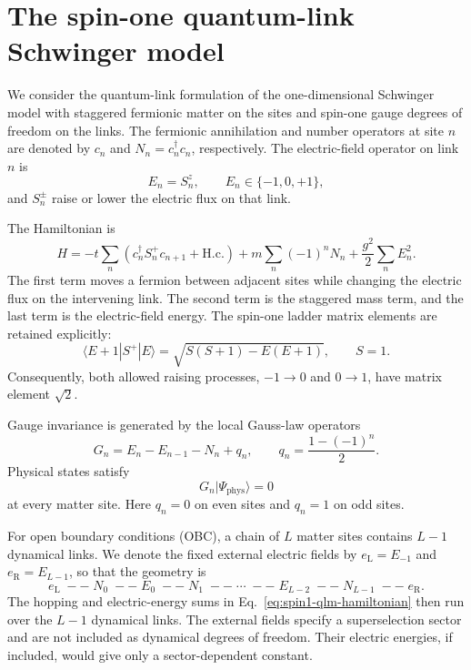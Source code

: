 \section{The spin-one quantum-link Schwinger model}
\label{sec:spin1-qlm-model}

We consider the quantum-link formulation of the one-dimensional Schwinger
model with staggered fermionic matter on the sites and spin-one gauge degrees
of freedom on the links.  The fermionic annihilation and number operators at
site $n$ are denoted by $c_n$ and
$N_n=c_n^\dagger c_n$, respectively.  The electric-field operator on link
$n$ is
\begin{equation}
    E_n = S_n^z,
    \qquad E_n\in\{-1,0,+1\},
\end{equation}
and $S_n^\pm$ raise or lower the electric flux on that link.

The Hamiltonian is
\begin{equation}
\label{eq:spin1-qlm-hamiltonian}
    H =
    -t\sum_n
    \left(c_n^\dagger S_n^+c_{n+1}+\mathrm{H.c.}\right)
    +m\sum_n(-1)^nN_n
    +\frac{g^2}{2}\sum_n E_n^2 .
\end{equation}
The first term moves a fermion between adjacent sites while changing the
electric flux on the intervening link.  The second term is the staggered mass
term, and the last term is the electric-field energy.  The spin-one ladder
matrix elements are retained explicitly:
\begin{equation}
\label{eq:spin1-ladder-element}
    \langle E+1|S^+|E\rangle
    =\sqrt{S(S+1)-E(E+1)},
    \qquad S=1.
\end{equation}
Consequently, both allowed raising processes, $-1\to0$ and $0\to1$, have
matrix element $\sqrt{2}$.

Gauge invariance is generated by the local Gauss-law operators
\begin{equation}
\label{eq:gauss-law}
    G_n=E_n-E_{n-1}-N_n+q_n,
    \qquad
    q_n=\frac{1-(-1)^n}{2}.
\end{equation}
Physical states satisfy
\begin{equation}
    G_n|\Psi_{\mathrm{phys}}\rangle=0
\end{equation}
at every matter site.  Here $q_n=0$ on even sites and $q_n=1$ on odd sites.

For open boundary conditions (OBC), a chain of $L$ matter sites contains
$L-1$ dynamical links.  We denote the fixed external electric fields by
$e_{\mathrm L}=E_{-1}$ and $e_{\mathrm R}=E_{L-1}$, so that the geometry is
\begin{equation}
 e_{\mathrm L}
 \;--\;N_0\;--\;E_0\;--\;N_1\;--\;\cdots\;--\;
 E_{L-2}\;--\;N_{L-1}\;--\;e_{\mathrm R}.
\end{equation}
The hopping and electric-energy sums in Eq.~\eqref{eq:spin1-qlm-hamiltonian}
then run over the $L-1$ dynamical links.  The external fields specify a
superselection sector and are not included as dynamical degrees of freedom.
Their electric energies, if included, would give only a sector-dependent
constant.

